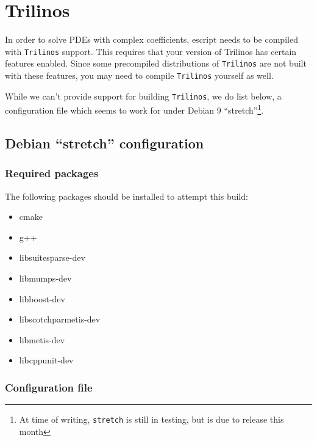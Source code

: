 \chapter{Trilinos}
\label{app:trilinos}

In order to solve PDEs with complex coefficients, escript needs to be compiled with \texttt{Trilinos} support.
This requires that your version of Trilinos has certain features enabled.
Since some precompiled distributions of \texttt{Trilinos} are not built with these features, you may 
need to compile \texttt{Trilinos} yourself as well.

While we can't provide support for building \texttt{Trilinos}, we do list below, a configuration file which seems to work for 
under Debian 9 ``stretch''\footnote{At time of writing, \texttt{stretch} is still in testing, but is due to release this month}.

\section{Debian ``stretch'' configuration}


\subsection{Required packages}

The following packages should be installed to attempt this build:
\begin{itemize}
\item[] cmake
\item[] g++
\item[] libsuitesparse-dev
\item[] libmumps-dev
\item[] libboost-dev
\item[] libscotchparmetis-dev
\item[] libmetis-dev
\item[] libcppunit-dev
\end{itemize}



\subsection{Configuration file}

